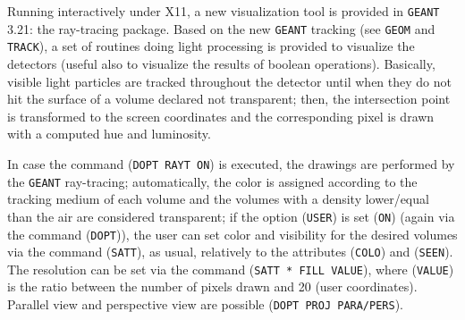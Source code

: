 
Running interactively under X11, a new visualization tool is provided in
{\tt GEANT} 3.21: the ray-tracing package. Based on the new 
{\tt GEANT} tracking (see
{\tt GEOM} and {\tt TRACK}), 
a set of routines doing light processing is provided to
visualize the detectors (useful also to visualize the results of boolean
operations).
Basically, visible light particles are tracked
throughout the detector until when they do not hit the surface of a volume
declared not transparent; then, the intersection point is transformed to 
the screen coordinates and the corresponding pixel is drawn with a computed 
hue and luminosity. 


In case the command ({\tt DOPT RAYT ON}) is executed,
the drawings are performed by the {\tt GEANT} ray-tracing;
automatically, the color is assigned according to the tracking medium of each
volume and the volumes with a density lower/equal than the air are considered
transparent; if the option ({\tt USER}) is set ({\tt ON}) 
(again via the command ({\tt DOPT})),
the user can set color and visibility for the desired volumes via the command
({\tt SATT}), as usual, relatively to the attributes ({\tt COLO}) and 
({\tt SEEN}).
The resolution can be set via the command 
({\tt SATT * FILL VALUE}), where ({\tt VALUE})
is the ratio between the number of pixels drawn and 20 (user coordinates).
Parallel view and perspective view are possible 
({\tt DOPT PROJ PARA/PERS}).

